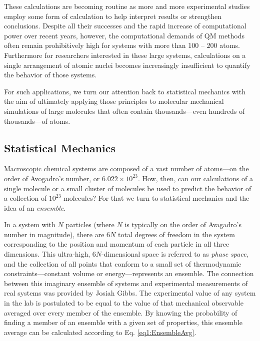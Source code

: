 These calculations are becoming routine as more and more experimental studies
employ some form of calculation to help interpret results or strengthen
conclusions. Despite all their successes and the rapid increase of computational
power over recent years, however, the computational demands of QM methods often
remain prohibitively high for systems with more than 100 -- 200 atoms.
Furthermore for researchers interested in these large systems, calculations on a
single arrangement of atomic nuclei becomes increasingly insufficient to
quantify the behavior of those systems.

For such applications, we turn our attention back to statistical mechanics with
the aim of ultimately applying those principles to molecular mechanical
simulations of large molecules that often contain thousands---even hundreds of
thousands---of atoms.

\subsection{Statistical Mechanics}

Macroscopic chemical systems are composed of a vast number of atoms---on the
order of Avogadro's number, or $6.022 \times 10 ^ {23}$. How, then, can our
calculations of a single molecule or a small cluster of molecules be used to
predict the behavior of a collection of $10 ^ {23}$ molecules? For that we turn
to statistical mechanics and the idea of an \emph{ensemble}.

In a system with $N$ particles (where $N$ is typically on the order of
Avagadro's number in magnitude), there are $6 N$ total degrees of freedom in the
system corresponding to the position and momentum of each particle in all three
dimensions. This ultra-high, $6N$-dimensional space is referred to as
\emph{phase space}, and the collection of all points that conform to a small set
of thermodynamic constraints---\eg constant volume or energy---represents an
ensemble. \cite{McQuarrie_Book_StatMech_1973} The connection between this
imaginary ensemble of systems and experimental measurements of real systems was
provided by Josiah Gibbs. The experimental value of any system in the lab is
postulated to be equal to the value of that mechanical observable averaged over
every member of the ensemble. \cite{McQuarrie_Book_StatMech_1973} By knowing the
probability of finding a member of an ensemble with a given set of properties,
this ensemble average can be calculated according to Eq. \ref{eq1:EnsembleAvg}.

